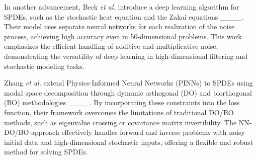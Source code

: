 In another advancement, Beck \textit{et al.} introduce a deep learning algorithm for SPDEs, such as the stochastic heat equation and the Zakai equations ____. Their model uses separate neural networks for each realization of the noise process, achieving high accuracy even in 50-dimensional problems. This work emphasizes the efficient handling of additive and multiplicative noise, demonstrating the versatility of deep learning in high-dimensional filtering and stochastic modeling tasks.

Zhang \textit{et al.} extend Physics-Informed Neural Networks (PINNs) to SPDEs using modal space decomposition through dynamic orthogonal (DO) and biorthogonal (BO) methodologies ____. By incorporating these constraints into the loss function, their framework overcomes the limitations of traditional DO/BO methods, such as eigenvalue crossing or covariance matrix invertibility. The NN-DO/BO approach effectively handles forward and inverse problems with noisy initial data and high-dimensional stochastic inputs, offering a flexible and robust method for solving SPDEs.